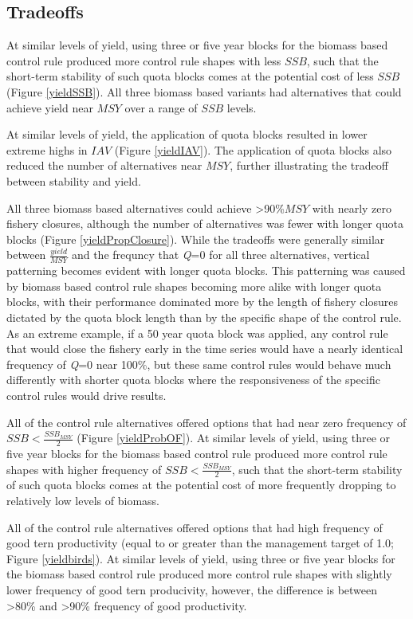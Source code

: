 \documentclass[]{article}
\begin{document}
\subsection{Tradeoffs}\label{tradeoffs}

At similar levels of yield, using three or five year blocks for the
biomass based control rule produced more control rule shapes with less
\(SSB\), such that the short-term stability of such quota blocks comes
at the potential cost of less \(SSB\) (Figure \ref{yieldSSB}). All three
biomass based variants had alternatives that could achieve yield near
\(MSY\) over a range of \(SSB\) levels.

At similar levels of yield, the application of quota blocks resulted in
lower extreme highs in \(IAV\) (Figure \ref{yieldIAV}). The application
of quota blocks also reduced the number of alternatives near \(MSY\),
further illustrating the tradeoff between stability and yield.

All three biomass based alternatives could achieve
\textgreater{}90\%\(MSY\) with nearly zero fishery closures, although
the number of alternatives was fewer with longer quota blocks (Figure
\ref{yieldPropClosure}). While the tradeoffs were generally similar
between \(\frac{yield}{MSY}\) and the frequncy that \emph{Q}=0 for all
three alternatives, vertical patterning becomes evident with longer
quota blocks. This patterning was caused by biomass based control rule
shapes becoming more alike with longer quota blocks, with their
performance dominated more by the length of fishery closures dictated by
the quota block length than by the specific shape of the control rule.
As an extreme example, if a 50 year quota block was applied, any control
rule that would close the fishery early in the time series would have a
nearly identical frequency of \emph{Q}=0 near 100\%, but these same
control rules would behave much differently with shorter quota blocks
where the responsiveness of the specific control rules would drive
results.

All of the control rule alternatives offered options that had near zero
frequency of \(SSB < \frac{SSB_{MSY}}{2}\) (Figure \ref{yieldProbOF}).
At similar levels of yield, using three or five year blocks for the
biomass based control rule produced more control rule shapes with higher
frequency of \(SSB < \frac{SSB_{MSY}}{2}\), such that the short-term
stability of such quota blocks comes at the potential cost of more
frequently dropping to relatively low levels of biomass.

All of the control rule alternatives offered options that had high
frequency of good tern productivity (equal to or greater than the
management target of 1.0; Figure \ref{yieldbirds}). At similar levels of
yield, using three or five year blocks for the biomass based control
rule produced more control rule shapes with slightly lower frequency of
good tern producivity, however, the difference is between
\textgreater{}80\% and \textgreater{}90\% frequency of good
productivity.
\end{document}
